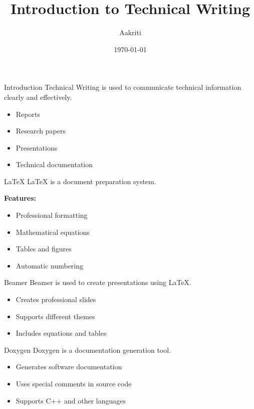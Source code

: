\documentclass{beamer}
\title{Introduction to Technical Writing}
\author{Aakriti}
\institute{Computer Science and Engineering}
\date{\today}
\begin{document}
\begin{frame}
    \titlepage
\end{frame}

\begin{frame}{Introduction}
    Technical Writing is used to communicate
    technical information clearly and effectively.

    \begin{itemize}
        \item Reports
        \item Research papers
        \item Presentations
        \item Technical documentation
    \end{itemize}
\end{frame}

\begin{frame}{LaTeX}
    LaTeX is a document preparation system.

    \textbf{Features:}
    \begin{itemize}
        \item Professional formatting
        \item Mathematical equations
        \item Tables and figures
        \item Automatic numbering
    \end{itemize}
\end{frame}

\begin{frame}{Beamer}
    Beamer is used to create presentations using LaTeX.

    \begin{itemize}
        \item Creates professional slides
        \item Supports different themes
        \item Includes equations and tables
    \end{itemize}
\end{frame}

\begin{frame}{Doxygen}
    Doxygen is a documentation generation tool.

    \begin{itemize}
        \item Generates software documentation
        \item Uses special comments in source code
        \item Supports C++ and other languages
    \end{itemize}
\end{frame}
\end{document}
